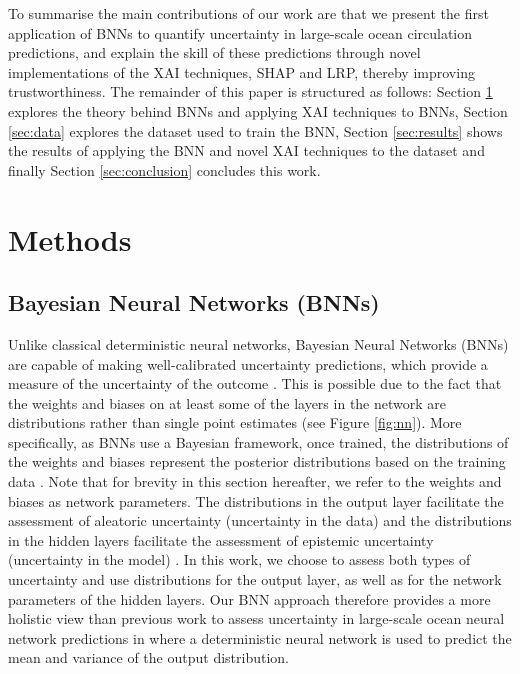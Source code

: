 \documentclass[a4paper]{article}
\begin{document}
To summarise the main contributions of our work are that we present the first application of BNNs to quantify uncertainty in large-scale ocean circulation predictions, and explain the skill of these predictions through novel implementations of the XAI techniques, SHAP and LRP, thereby improving trustworthiness. The remainder of this paper is structured as follows: Section \ref{sec:methods} explores the theory behind BNNs and applying XAI techniques to BNNs, Section \ref{sec:data} explores the dataset used to train the BNN, Section \ref{sec:results} shows the results of applying the BNN and novel XAI techniques to the dataset and finally Section \ref{sec:conclusion} concludes this work.

\section{Methods}\label{sec:methods}
\subsection{Bayesian Neural Networks (BNNs)}\label{sec:BNN}
Unlike classical deterministic neural networks, Bayesian Neural Networks (BNNs) are capable of making well-calibrated uncertainty predictions, which provide a measure of the uncertainty of the outcome \citep{jospin2020hands}. This is possible due to the fact that the weights and biases on at least some of the layers in the network are distributions rather than single point estimates (see Figure \ref{fig:nn}). More specifically, as BNNs use a Bayesian framework, once trained, the distributions of the weights and biases represent the posterior distributions based on the training data \citep{Bykov2020}. Note that for brevity in this section hereafter, we refer to the weights and biases as network parameters. The distributions in the output layer facilitate the assessment of aleatoric uncertainty (uncertainty in the data) and the distributions in the hidden layers facilitate the assessment of epistemic uncertainty (uncertainty in the model) \citep{salama_2021}. In this work, we choose to assess both types of uncertainty and use distributions for the output layer, as well as for the network parameters of the hidden layers. Our BNN approach therefore provides a more holistic view than previous work to assess uncertainty in large-scale ocean neural network predictions in \cite{gordon2022incorporating} where a deterministic neural network is used to predict the mean and variance of the output distribution.
\end{document}
